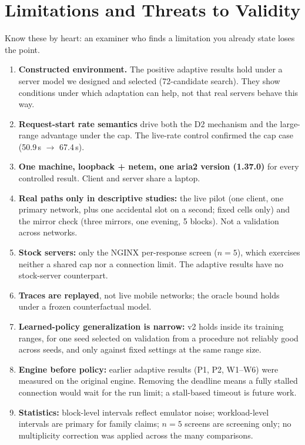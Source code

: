 \chapter{Limitations and Threats to Validity}\label{ch:limits}
Know these by heart: an examiner who finds a limitation you already state loses the point.

\begin{enumerate}
\item \textbf{Constructed environment.} The positive adaptive results hold under a server model we designed and selected (72-candidate search). They show conditions under which adaptation can help, not that real servers behave this way.
\item \textbf{Request-start rate semantics} drive both the D2 mechanism and the large-range advantage under the cap. The live-rate control confirmed the cap case (50.9\,s $\to$ 67.4\,s).
\item \textbf{One machine, loopback + netem, one aria2 version (1.37.0)} for every controlled result. Client and server share a laptop.
\item \textbf{Real paths only in descriptive studies:} the live pilot (one client, one primary network, plus one accidental slot on a second; fixed cells only) and the mirror check (three mirrors, one evening, 5 blocks). Not a validation across networks.
\item \textbf{Stock servers:} only the NGINX per-response screen ($n=5$), which exercises neither a shared cap nor a connection limit. The adaptive results have no stock-server counterpart.
\item \textbf{Traces are replayed}, not live mobile networks; the oracle bound holds under a frozen counterfactual model.
\item \textbf{Learned-policy generalization is narrow:} v2 holds inside its training ranges, for one seed selected on validation from a procedure not reliably good across seeds, and only against fixed settings at the same range size.
\item \textbf{Engine before policy:} earlier adaptive results (P1, P2, W1--W6) were measured on the original engine. Removing the deadline means a fully stalled connection would wait for the run limit; a stall-based timeout is future work.
\item \textbf{Statistics:} block-level intervals reflect emulator noise; workload-level intervals are primary for family claims; $n=5$ screens are screening only; no multiplicity correction was applied across the many comparisons.

\end{enumerate}

